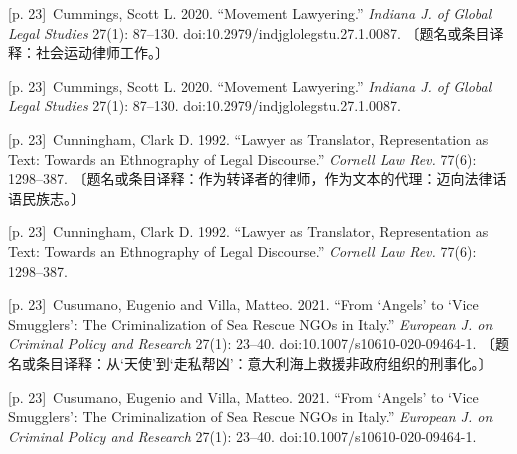 \documentclass[10pt,a4paper]{article}
\begin{document}
\noindent\begin{minipage}{\textwidth}\begin{minipage}[t]{\dimexpr.5\textwidth-4mm\relax}{\scriptsize\color{gray} [p. 23]}\ Cummings, Scott L. 2020. “Movement Lawyering.” \textit{Indiana J. of Global Legal Studies} 27(1): 87–130. doi:10.2979/indjglolegstu.27.1.0087. 〔题名或条目译释：社会运动律师工作。〕\par\end{minipage}\hfill\begin{minipage}[t]{\dimexpr.5\textwidth-4mm\relax}{\scriptsize\color{gray} [p. 23]}\ Cummings, Scott L. 2020. “Movement Lawyering.” \textit{Indiana J. of Global Legal Studies} 27(1): 87–130. doi:10.2979/indjglolegstu.27.1.0087.\par\end{minipage}\end{minipage}\par
\noindent\begin{minipage}{\textwidth}\begin{minipage}[t]{\dimexpr.5\textwidth-4mm\relax}{\scriptsize\color{gray} [p. 23]}\ Cunningham, Clark D. 1992. “Lawyer as Translator, Representation as Text: Towards an Ethnography of Legal Discourse.” \textit{Cornell Law Rev.} 77(6): 1298–387. 〔题名或条目译释：作为转译者的律师，作为文本的代理：迈向法律话语民族志。〕\par\end{minipage}\hfill\begin{minipage}[t]{\dimexpr.5\textwidth-4mm\relax}{\scriptsize\color{gray} [p. 23]}\ Cunningham, Clark D. 1992. “Lawyer as Translator, Representation as Text: Towards an Ethnography of Legal Discourse.” \textit{Cornell Law Rev.} 77(6): 1298–387.\par\end{minipage}\end{minipage}\par
\noindent\begin{minipage}{\textwidth}\begin{minipage}[t]{\dimexpr.5\textwidth-4mm\relax}{\scriptsize\color{gray} [p. 23]}\ Cusumano, Eugenio and Villa, Matteo. 2021. “From ‘Angels’ to ‘Vice Smugglers’: The Criminalization of Sea Rescue NGOs in Italy.” \textit{European J. on Criminal Policy and Research} 27(1): 23–40. doi:10.1007/s10610-020-09464-1. 〔题名或条目译释：从‘天使’到‘走私帮凶’：意大利海上救援非政府组织的刑事化。〕\par\end{minipage}\hfill\begin{minipage}[t]{\dimexpr.5\textwidth-4mm\relax}{\scriptsize\color{gray} [p. 23]}\ Cusumano, Eugenio and Villa, Matteo. 2021. “From ‘Angels’ to ‘Vice Smugglers’: The Criminalization of Sea Rescue NGOs in Italy.” \textit{European J. on Criminal Policy and Research} 27(1): 23–40. doi:10.1007/s10610-020-09464-1.\par\end{minipage}\end{minipage}\par
\end{document}
